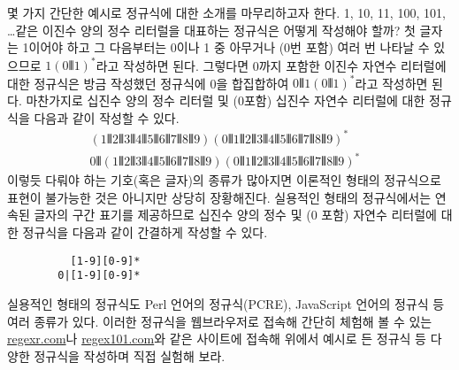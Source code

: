 몇 가지 간단한 예시로 정규식에 대한 소개를 마무리하고자 한다.
1, 10, 11, 100, 101, \ldots 같은 이진수 양의 정수 리터럴을
대표하는 정규식은 어떻게 작성해야 할까? 첫 글자는 1이어야 하고
그 다음부터는 0이나 1 중 아무거나 (0번 포함) 여러 번 나타날 수
있으므로 $1(0\VERT{}1)^{*}$라고 작성하면 된다. 그렇다면 0까지 포함한
이진수 자연수 리터럴에 대한 정규식은 방금 작성했던 정규식에
0을 합집합하여 $0\VERT{}1(0\VERT{}1)^{*}$라고 작성하면 된다.
마찬가지로 십진수 양의 정수 리터럴 및 (0포함)
십진수 자연수 리터럴에 대한 정규식을 다음과 같이 작성할 수 있다.
\vspace*{-1ex}
\begin{align*}
(1\VERT 2\VERT 3\VERT 4\VERT 5\VERT 6\VERT 7\VERT 8\VERT 9)
 (0\VERT 1\VERT 2\VERT 3\VERT 4\VERT 5\VERT 6\VERT 7\VERT 8\VERT 9)^{*} &
\\
0\VERT
 (1\VERT 2\VERT 3\VERT 4\VERT 5\VERT 6\VERT 7\VERT 8\VERT 9)
 (0\VERT 1\VERT 2\VERT 3\VERT 4\VERT 5\VERT 6\VERT 7\VERT 8\VERT 9)^{*} &
\end{align*}
이렇듯 다뤄야 하는 기호(혹은 글자)의 종류가 많아지면 이론적인 형태의
정규식으로 표현이 불가능한 것은 아니지만 상당히 장황해진다.
실용적인 형태의 정규식에서는 연속된 글자의 구간 표기를 제공하므로
십진수 양의 정수 및 (0 포함) 자연수 리터럴에 대한 정규식을
다음과 같이 간결하게 작성할 수 있다.
\begin{verbatim}
          [1-9][0-9]*
        0|[1-9][0-9]*
\end{verbatim}
실용적인 형태의 정규식도 Perl 언어의 정규식(PCRE),
JavaScript 언어의 정규식 등 여러 종류가 있다.
이러한 정규식을 웹브라우저로 접속해 간단히 체험해 볼 수 있는
\href{https://regexr.com/}{regexr.com}나
\href{https://regex101.com/}{regex101.com}와 같은 사이트에 접속해
위에서 예시로 든 정규식 등 다양한 정규식을 작성하며 직접 실험해 보라.


